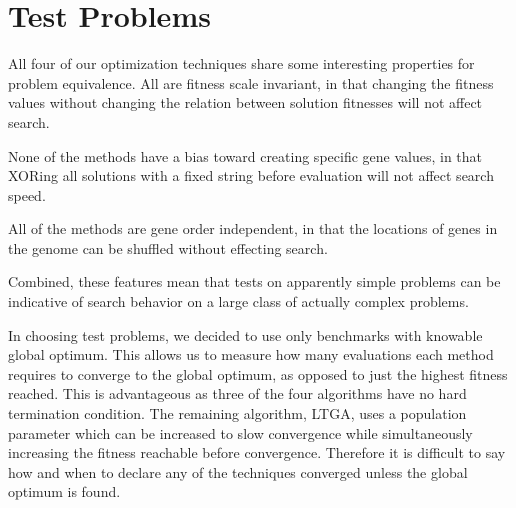 \documentclass{sig-alternate}
\begin{document}
\section{Test Problems}
All four of our optimization techniques share some interesting properties for
problem equivalence.  All are fitness scale invariant, in that changing
the fitness values without changing the relation between solution fitnesses will not affect search.
\begin{comment}This is true because none of the methods
uses the fitness values directly, only when comparing the relative fitness between
two solutions using boolean operators.  This does not hold true for some optimization
methods, for instance fitness proportional selection.
\end{comment}
None of the methods have a bias toward creating specific gene values, in that
XORing all solutions with a fixed string before evaluation will not affect search speed.
\begin{comment}
This means all of the optimizers
will have unchanged behavior if a problem's inputs are reflected or XOR'd with a fixed string.  As
an example, the problem of \emph{maximize the number of ones} in a solution will be treated identically
to the problem of \emph{maximize the number of zeros} in a solution.  Both are also identical
to the problem of minimizing the hamming distance to any arbitrary solution.
\end{comment}
All of the methods are gene order independent, in that the locations of genes
in the genome can be shuffled without effecting search.
\begin{comment}
This means that the location
of genes in the genome can be randomly shuffled without effecting search behavior.
This is not true in many evolutionary systems due to crossover.  For example,
when using one point crossover the distance between genes in the genome effects the
probability they will be kept together through a crossover.
\end{comment}
Combined, these features mean that tests on apparently simple problems can be
indicative of search behavior on a large class of actually complex problems.

In choosing test problems, we decided to use only benchmarks with knowable global
optimum.  This allows us to measure how many evaluations each method requires to converge to the
global optimum, as opposed to just the highest fitness reached.  This is advantageous
as three of the four algorithms have no hard termination condition.  The remaining
algorithm, LTGA, uses a population parameter which can be increased to slow
convergence while simultaneously increasing the fitness reachable before convergence.
Therefore it is difficult to say how and when to declare any of the techniques
converged unless the global optimum is found.
\end{document}
